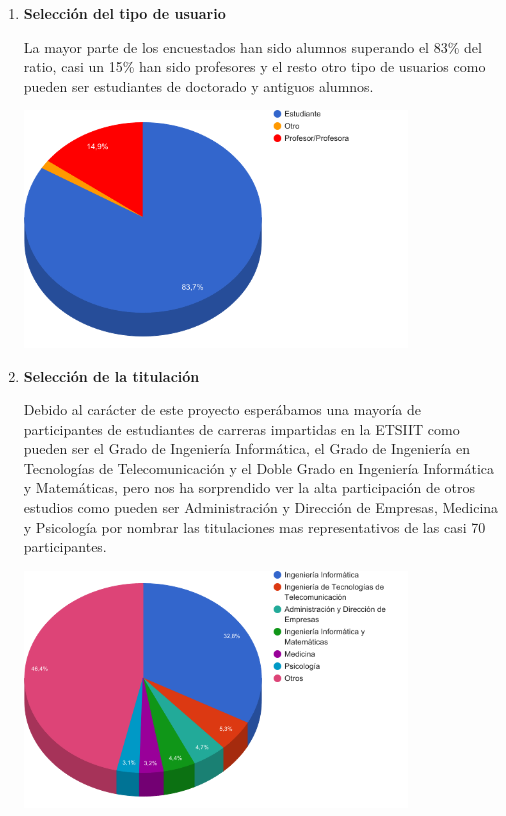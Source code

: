 \begin{enumerate}

  \item \textbf{Selección del tipo de usuario} 
  
  La mayor parte de los encuestados han sido alumnos superando el 83\% del ratio, casi un 15\% han sido profesores y el resto otro tipo de usuarios como pueden  ser estudiantes de doctorado y antiguos alumnos.
  
  
	\includegraphics[width=0.8\textwidth]{../charts/01_esusted}
  

  \item \textbf{Selección de la titulación} 
  
  Debido al carácter de este proyecto esperábamos una mayoría de participantes de estudiantes de carreras impartidas en la ETSIIT como pueden ser el Grado de Ingeniería Informática, el Grado de Ingeniería en Tecnologías de Telecomunicación y el Doble Grado en Ingeniería Informática y Matemáticas, pero nos ha sorprendido ver la alta participación de otros estudios como pueden ser Administración y Dirección de Empresas, Medicina y Psicología por nombrar las titulaciones mas representativos de las casi 70 participantes.
  
  \includegraphics[width=0.8\textwidth]{../charts/02_titulacion}



\end{enumerate}
